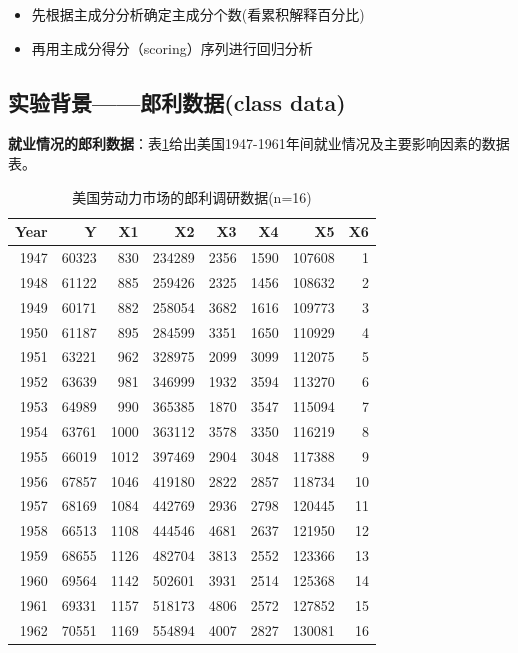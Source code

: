 \documentclass[12pt,(landscape,a4paper),(portrait,a4paper)]{article}
\providecommand{\tightlist}{%
  \setlength{\itemsep}{0pt}\setlength{\parskip}{0pt}}
\begin{document}
\begin{enumerate}
\begin{enumerate}
\begin{itemize}
      \begin{itemize}
      \tightlist
      \item
        先根据主成分分析确定主成分个数(看累积解释百分比)
      \item
        再用主成分得分（scoring）序列进行回归分析
      \end{itemize}
    \end{itemize}
  \end{enumerate}
\end{enumerate}

\newpage

\hypertarget{class-data}{%
\subsection{实验背景------郎利数据(class data)}\label{class-data}}

\textbf{就业情况的郎利数据}：表\ref{tab:longley-long}给出美国1947-1961年间就业情况及主要影响因素的数据表。

\begin{table}

\caption{\label{tab:longley-long}美国劳动力市场的郎利调研数据(n=16)}
\centering
\begin{tabular}[t]{r|r|r|r|r|r|r|r}
\hline
Year & Y & X1 & X2 & X3 & X4 & X5 & X6\\
\hline
1947 & 60323 & 830 & 234289 & 2356 & 1590 & 107608 & 1\\
\hline
1948 & 61122 & 885 & 259426 & 2325 & 1456 & 108632 & 2\\
\hline
1949 & 60171 & 882 & 258054 & 3682 & 1616 & 109773 & 3\\
\hline
1950 & 61187 & 895 & 284599 & 3351 & 1650 & 110929 & 4\\
\hline
1951 & 63221 & 962 & 328975 & 2099 & 3099 & 112075 & 5\\
\hline
1952 & 63639 & 981 & 346999 & 1932 & 3594 & 113270 & 6\\
\hline
1953 & 64989 & 990 & 365385 & 1870 & 3547 & 115094 & 7\\
\hline
1954 & 63761 & 1000 & 363112 & 3578 & 3350 & 116219 & 8\\
\hline
1955 & 66019 & 1012 & 397469 & 2904 & 3048 & 117388 & 9\\
\hline
1956 & 67857 & 1046 & 419180 & 2822 & 2857 & 118734 & 10\\
\hline
1957 & 68169 & 1084 & 442769 & 2936 & 2798 & 120445 & 11\\
\hline
1958 & 66513 & 1108 & 444546 & 4681 & 2637 & 121950 & 12\\
\hline
1959 & 68655 & 1126 & 482704 & 3813 & 2552 & 123366 & 13\\
\hline
1960 & 69564 & 1142 & 502601 & 3931 & 2514 & 125368 & 14\\
\hline
1961 & 69331 & 1157 & 518173 & 4806 & 2572 & 127852 & 15\\
\hline
1962 & 70551 & 1169 & 554894 & 4007 & 2827 & 130081 & 16\\
\hline
\end{tabular}
\end{table}
\end{document}
